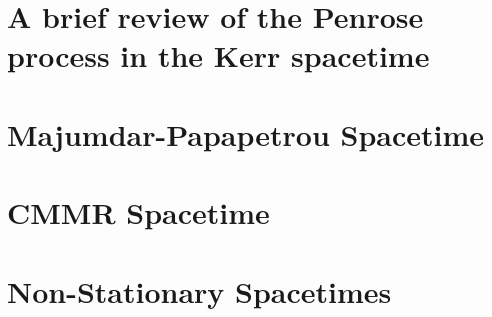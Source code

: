 

\section{A brief review of the Penrose process in the Kerr spacetime}
\label{ch:penrose_binaries:sec:penrose_review}


\section{Majumdar-Papapetrou Spacetime}
\label{ch:penrose_binaries:sec:mp_penrose}


\section{\ac{CMMR} Spacetime}
\label{ch:penrose_binaries:sec:cmmr_penrose}


\section{Non-Stationary Spacetimes}
\label{ch:penrose_binaries:sec:arbitrary_penrose}

